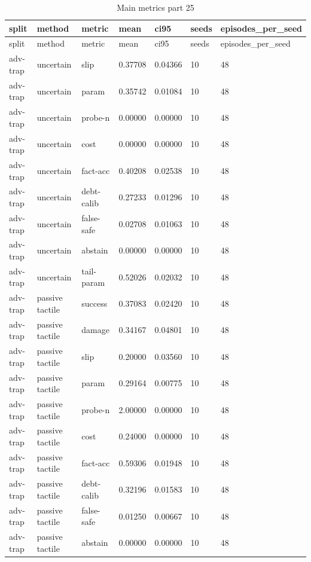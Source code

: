 \documentclass{article}
\begin{document}
\begin{center}
\tiny
\renewcommand{\arraystretch}{0.92}
\setlength{\tabcolsep}{3pt}
\begin{longtable}{lllllll}
\caption{Main metrics part 25}\label{tab:main-metrics-25}\\
\toprule
split & method & metric & mean & ci95 & seeds & episodes\_per\_seed \\
\midrule
\endfirsthead
\toprule
split & method & metric & mean & ci95 & seeds & episodes\_per\_seed \\
\midrule
\endhead
adv-trap & uncertain & slip & 0.37708 & 0.04366 & 10 & 48 \\
adv-trap & uncertain & param & 0.35742 & 0.01084 & 10 & 48 \\
adv-trap & uncertain & probe-n & 0.00000 & 0.00000 & 10 & 48 \\
adv-trap & uncertain & cost & 0.00000 & 0.00000 & 10 & 48 \\
adv-trap & uncertain & fact-acc & 0.40208 & 0.02538 & 10 & 48 \\
adv-trap & uncertain & debt-calib & 0.27233 & 0.01296 & 10 & 48 \\
adv-trap & uncertain & false-safe & 0.02708 & 0.01063 & 10 & 48 \\
adv-trap & uncertain & abstain & 0.00000 & 0.00000 & 10 & 48 \\
adv-trap & uncertain & tail-param & 0.52026 & 0.02032 & 10 & 48 \\
adv-trap & passive tactile & success & 0.37083 & 0.02420 & 10 & 48 \\
adv-trap & passive tactile & damage & 0.34167 & 0.04801 & 10 & 48 \\
adv-trap & passive tactile & slip & 0.20000 & 0.03560 & 10 & 48 \\
adv-trap & passive tactile & param & 0.29164 & 0.00775 & 10 & 48 \\
adv-trap & passive tactile & probe-n & 2.00000 & 0.00000 & 10 & 48 \\
adv-trap & passive tactile & cost & 0.24000 & 0.00000 & 10 & 48 \\
adv-trap & passive tactile & fact-acc & 0.59306 & 0.01948 & 10 & 48 \\
adv-trap & passive tactile & debt-calib & 0.32196 & 0.01583 & 10 & 48 \\
adv-trap & passive tactile & false-safe & 0.01250 & 0.00667 & 10 & 48 \\
adv-trap & passive tactile & abstain & 0.00000 & 0.00000 & 10 & 48 \\

\end{longtable}
\end{center}
\end{document}
